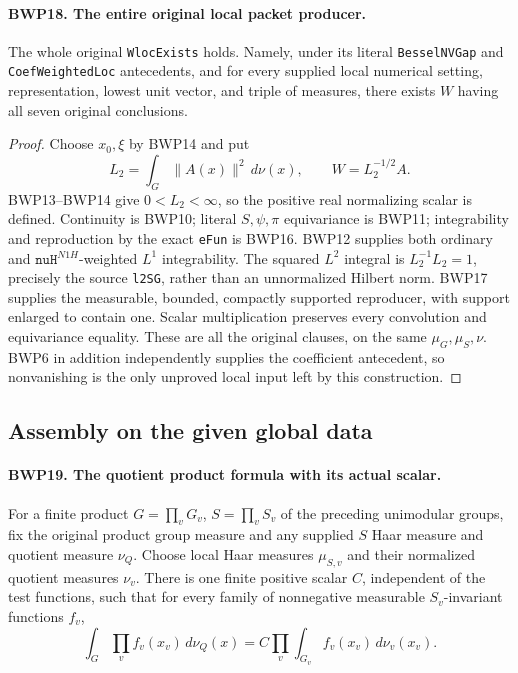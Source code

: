 \paragraph{BWP18. The entire original local packet producer.}
\label{claim:BWP18}
The whole original \texttt{WlocExists} holds.  Namely, under its
literal \texttt{BesselNVGap} and \texttt{CoefWeightedLoc}
antecedents, and for every supplied local numerical setting,
representation, lowest unit vector, and triple of measures, there
exists \(W\) having all seven original conclusions.

\begin{proof}
Choose \(x_0,\xi\) by BWP14 and put
\[
 L_2=\int_G\|A(x)\|^2\,d\nu(x),\qquad W=L_2^{-1/2}A.
 \tag{BWP.24}
\]
BWP13--BWP14 give \(0<L_2<\infty\), so the positive real
normalizing scalar is defined.  Continuity is BWP10; literal
\(S,\psi,\pi\) equivariance is BWP11; integrability and reproduction
by the exact \texttt{eFun} is BWP16.  BWP12 supplies both ordinary
and \(\texttt{nuH}^{N1H}\)-weighted \(L^1\) integrability.
The squared \(L^2\) integral is
\(L_2^{-1}L_2=1\), precisely the source \texttt{l2SG}, rather
than an unnormalized Hilbert norm.  BWP17 supplies the measurable,
bounded, compactly supported reproducer, with support enlarged to
contain one.  Scalar multiplication preserves every convolution and
equivariance equality.  These are all the original clauses, on the
same \(\mu_G,\mu_S,\nu\).  BWP6 in addition independently supplies
the coefficient antecedent, so nonvanishing is the only unproved
local input left by this construction.
\end{proof}

\subsection{Assembly on the given global data}

\paragraph{BWP19. The quotient product formula with its actual scalar.}
\label{claim:BWP19}
For a finite product \(G=\prod_vG_v\), \(S=\prod_vS_v\)
of the preceding unimodular groups, fix the original product group
measure and any supplied \(S\) Haar measure and quotient measure
\(\nu_Q\).  Choose local Haar measures \(\mu_{S,v}\) and
their normalized quotient measures \(\nu_v\).  There is one
finite positive scalar \(C\), independent of the test functions,
such that for every family of nonnegative measurable
\(S_v\)-invariant functions \(f_v\),
\[
 \int_G\prod_v f_v(x_v)\,d\nu_Q(x)
   = C\prod_v\int_{G_v} f_v(x_v)\,d\nu_v(x_v).
 \tag{BWP.25}
\]

